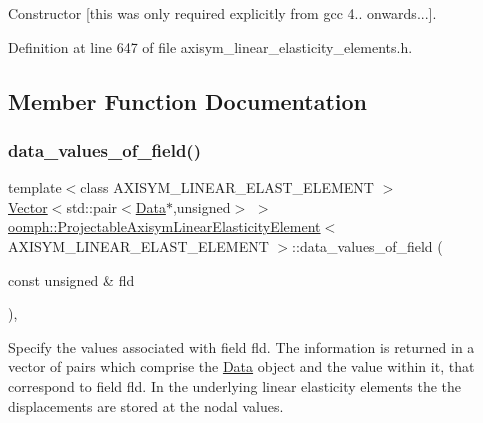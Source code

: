 Constructor \mbox{[}this was only required explicitly from gcc 4.. onwards...\mbox{]}. 



Definition at line 647 of file axisym\+\_\+linear\+\_\+elasticity\+\_\+elements.\+h.



\subsection{Member Function Documentation}
\mbox{\label{classoomph_1_1ProjectableAxisymLinearElasticityElement_aa2fdf62a0479bffad602ff39df9c7697}} 
\subsubsection{\texorpdfstring{data\+\_\+values\+\_\+of\+\_\+field()}{data\_values\_of\_field()}}
{\footnotesize\ttfamily template$<$class A\+X\+I\+S\+Y\+M\+\_\+\+L\+I\+N\+E\+A\+R\+\_\+\+E\+L\+A\+S\+T\+\_\+\+E\+L\+E\+M\+E\+NT $>$ \\
\hyperlink{classoomph_1_1Vector}{Vector}$<$std\+::pair$<$\hyperlink{classoomph_1_1Data}{Data}$\ast$,unsigned$>$ $>$ \hyperlink{classoomph_1_1ProjectableAxisymLinearElasticityElement}{oomph\+::\+Projectable\+Axisym\+Linear\+Elasticity\+Element}$<$ A\+X\+I\+S\+Y\+M\+\_\+\+L\+I\+N\+E\+A\+R\+\_\+\+E\+L\+A\+S\+T\+\_\+\+E\+L\+E\+M\+E\+NT $>$\+::data\+\_\+values\+\_\+of\+\_\+field (\begin{DoxyParamCaption}\item[{const unsigned \&}]{fld }\end{DoxyParamCaption})\hspace{0.3cm}{\ttfamily [inline]}, {\ttfamily [virtual]}}



Specify the values associated with field fld. The information is returned in a vector of pairs which comprise the \hyperlink{classoomph_1_1Data}{Data} object and the value within it, that correspond to field fld. In the underlying linear elasticity elements the the displacements are stored at the nodal values. 



